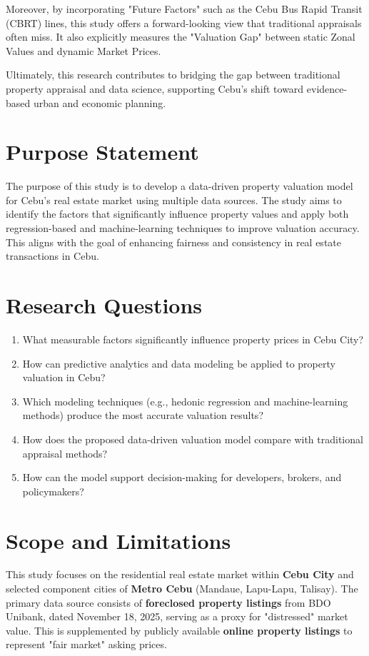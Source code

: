 Moreover, by incorporating "Future Factors" such as the Cebu Bus Rapid Transit (CBRT) lines, this study offers a forward-looking view that traditional appraisals often miss. It also explicitly measures the "Valuation Gap" between static Zonal Values and dynamic Market Prices.

Ultimately, this research contributes to bridging the gap between traditional property appraisal and data science, supporting Cebu’s shift toward evidence-based urban and economic planning.

\section{Purpose Statement}

The purpose of this study is to develop a data-driven property valuation model for Cebu’s real estate market using multiple data sources. The study aims to identify the factors that significantly influence property values and apply both regression-based and machine-learning techniques to improve valuation accuracy. This aligns with the goal of enhancing fairness and consistency in real estate transactions in Cebu.

\section{Research Questions}

\begin{enumerate}
    \item What measurable factors significantly influence property prices in Cebu City?
    \item How can predictive analytics and data modeling be applied to property valuation in Cebu?
    \item Which modeling techniques (e.g., hedonic regression and machine-learning methods) produce the most accurate valuation results?
    \item How does the proposed data-driven valuation model compare with traditional appraisal methods?
    \item How can the model support decision-making for developers, brokers, and policymakers?
\end{enumerate}

\section{Scope and Limitations}

This study focuses on the residential real estate market within \textbf{Cebu City} and selected component cities of \textbf{Metro Cebu} (Mandaue, Lapu-Lapu, Talisay). The primary data source consists of \textbf{foreclosed property listings} from BDO Unibank, dated November 18, 2025, serving as a proxy for "distressed" market value. This is supplemented by publicly available \textbf{online property listings} to represent "fair market" asking prices.

